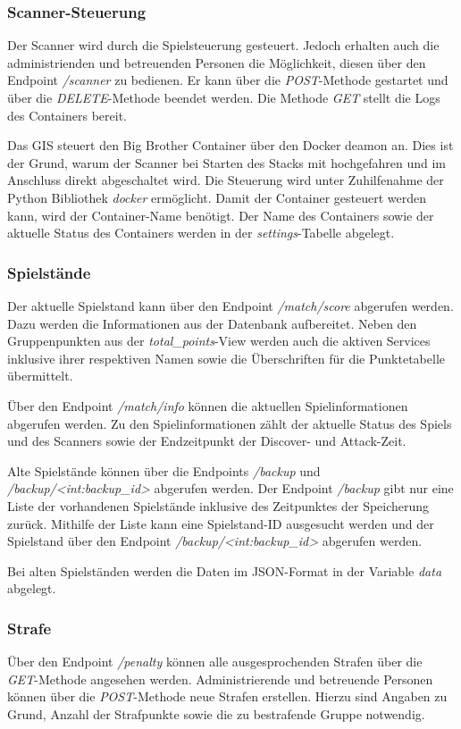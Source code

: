 \subsubsection{Scanner-Steuerung}
Der Scanner wird durch die Spielsteuerung gesteuert. Jedoch erhalten auch die administrienden und betreuenden Personen die Möglichkeit, diesen über den Endpoint \textit{/scanner} zu bedienen.
Er kann über die \textit{POST}-Methode gestartet und über die \textit{DELETE}-Methode beendet werden. Die Methode \textit{GET} stellt die Logs des Containers bereit.

Das GIS steuert den Big Brother Container über den Docker deamon an. Dies ist der Grund, warum der Scanner bei Starten des Stacks mit hochgefahren und im Anschluss direkt abgeschaltet wird. Die Steuerung wird unter Zuhilfenahme der Python Bibliothek \textit{docker} ermöglicht. Damit der Container gesteuert werden kann, wird der Container-Name benötigt. Der Name des Containers sowie der aktuelle Status des Containers werden in der \textit{settings}-Tabelle abgelegt.

\subsubsection{Spielstände}
Der aktuelle Spielstand kann über den Endpoint \textit{/match/score} abgerufen werden. Dazu werden die Informationen aus der Datenbank aufbereitet. Neben den Gruppenpunkten aus der \textit{total\_points}-View werden auch die aktiven Services inklusive ihrer respektiven Namen sowie die Überschriften für die Punktetabelle übermittelt.

Über den Endpoint \textit{/match/info} können die aktuellen Spielinformationen abgerufen werden. Zu den Spielinformationen zählt der aktuelle Status des Spiels und des Scanners sowie der Endzeitpunkt der Discover- und Attack-Zeit.

Alte Spielstände können über die Endpoints \textit{/backup} und \textit{/backup/<int:backup\_id>} abgerufen werden.
Der Endpoint \textit{/backup} gibt nur eine Liste der vorhandenen Spielstände inklusive des Zeitpunktes der Speicherung zurück. Mithilfe der Liste kann eine Spielstand-ID ausgesucht werden und der Spielstand über den Endpoint \textit{/backup/<int:backup\_id>} abgerufen werden.

Bei alten Spielständen werden die Daten im JSON-Format in der Variable \textit{data} abgelegt.

\subsubsection{Strafe}
Über den Endpoint \textit{/penalty} können alle ausgesprochenden Strafen über die \textit{GET}-Methode angesehen werden. Administrierende und betreuende Personen können über die \textit{POST}-Methode neue Strafen erstellen. Hierzu sind Angaben zu Grund, Anzahl der Strafpunkte sowie die zu bestrafende Gruppe notwendig.

